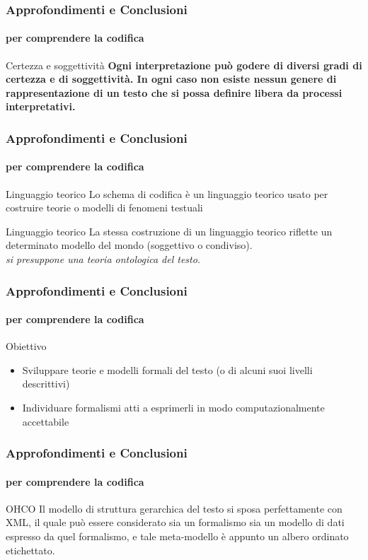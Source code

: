 \begin{frame}
	\frametitle{Approfondimenti e Conclusioni}
	\framesubtitle{per comprendere la codifica}
	\addtocounter{nframe}{1}

	\begin{block}{Certezza e soggettività}
		\textbf{Ogni interpretazione può godere di diversi gradi di certezza e di soggettività. In ogni caso non esiste nessun genere di rappresentazione di un testo che si possa definire libera da processi interpretativi.}
    \end{block}
   
\end{frame}

\begin{frame}
	\frametitle{Approfondimenti e Conclusioni}
	\framesubtitle{per comprendere la codifica}
	\addtocounter{nframe}{1}

	\begin{block}{Linguaggio teorico}
		Lo schema di codifica è un linguaggio teorico usato per costruire teorie o modelli di fenomeni testuali
    \end{block}

    \begin{block}{Linguaggio teorico}
        La stessa costruzione di un linguaggio teorico riflette un determinato modello del mondo (soggettivo o condiviso).
        \\ \textit{si presuppone una teoria ontologica del testo}.
    \end{block}
   
\end{frame}

\begin{frame}
	\frametitle{Approfondimenti e Conclusioni}
	\framesubtitle{per comprendere la codifica}
	\addtocounter{nframe}{1}

	\begin{block}{Obiettivo}
		\begin{itemize}
			\item Sviluppare teorie e modelli formali del testo (o di alcuni suoi livelli descrittivi)
			\item Individuare formalismi atti a esprimerli in modo computazionalmente accettabile
		\end{itemize}
	
    \end{block}
   
\end{frame}

\begin{frame}
	\frametitle{Approfondimenti e Conclusioni}
	\framesubtitle{per comprendere la codifica}
	\addtocounter{nframe}{1}

	\begin{block}{OHCO}
		 Il modello di struttura gerarchica del testo si sposa perfettamente con XML, il quale può essere considerato sia un formalismo sia un modello di dati espresso da quel formalismo, e tale meta-modello è appunto un albero ordinato etichettato.
	
    \end{block}
   
\end{frame}


